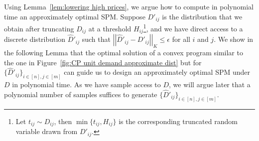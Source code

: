 Using Lemma~\ref{lem:lowering high prices}, we argue how to compute in polynomial time an approximately optimal SPM. Suppose $D'_{ij}$ is the distribution that we obtain after truncating $D_{ij}$ at a threshold $H_{ij}$\footnote{Let $t_{ij}\sim D_{ij}$, then $\min\{t_{ij},H_{ij}\}$ is the corresponding truncated random variable drawn from $D'_{ij}$.}, and we have direct access to a discrete distribution $\hat{D}'_{ij}$ such that $\left|\left|\hat{D}'_{ij}-D'_{ij}\right|\right|_K\leq \epsilon$ for all $i$ and $j$. We show in the following Lemma that the optimal solution of a convex program similar to the one in Figure~\ref{fig:CP unit demand approximate dist} but for $\{\hat{D}'_{ij}\}_{i\in[n],j\in[m]}$ can guide us to design an approximately optimal SPM under $D$ in polynomial time. As we have sample access to $D$, we will argue later that a polynomial number of samples suffices to generate $\{\hat{D}'_{ij}\}_{i\in[n],j\in[m]}$.%
